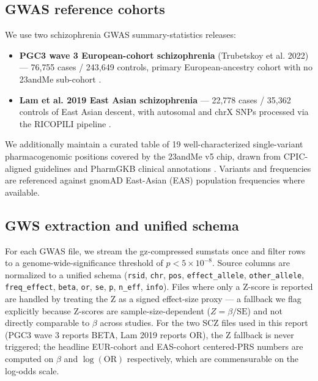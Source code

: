 \documentclass[11pt,a4paper]{article}
\begin{document}
\subsection{GWAS reference cohorts}
We use two schizophrenia GWAS summary-statistics releases:

\begin{itemize}
\item \textbf{PGC3 wave 3 European-cohort schizophrenia} (Trubetskoy et al. 2022) --- 76{,}755 cases / 243{,}649 controls, primary European-ancestry cohort with no 23andMe sub-cohort \cite{trubetskoy2022}.
\item \textbf{Lam et al. 2019 East Asian schizophrenia} --- 22{,}778 cases / 35{,}362 controls of East Asian descent, with autosomal and chrX SNPs processed via the RICOPILI pipeline \cite{lam2019}.
\end{itemize}

We additionally maintain a curated table of 19 well-characterized single-variant pharmacogenomic positions covered by the 23andMe v5 chip, drawn from CPIC-aligned guidelines and PharmGKB clinical annotations \cite{cpic2022clopidogrel,cpic2021ppi,cpic2022slco1b1,cpic2018dpyd,cpic2017warfarin,cpic2021oprm1,cpic2018hlab1502}. Variants and frequencies are referenced against gnomAD East-Asian (EAS) population frequencies where available.

\subsection{GWS extraction and unified schema}
For each GWAS file, we stream the gz-compressed sumstats once and filter rows to a genome-wide-significance threshold of $p < 5 \times 10^{-8}$. Source columns are normalized to a unified schema (\texttt{rsid}, \texttt{chr}, \texttt{pos}, \texttt{effect\_allele}, \texttt{other\_allele}, \texttt{freq\_effect}, \texttt{beta}, \texttt{or}, \texttt{se}, \texttt{p}, \texttt{n\_eff}, \texttt{info}). Files where only a Z-score is reported are handled by treating the Z as a signed effect-size proxy --- a fallback we flag explicitly because Z-scores are sample-size-dependent ($Z = \beta/\text{SE}$) and not directly comparable to $\beta$ across studies. For the two SCZ files used in this report (PGC3 wave 3 reports BETA, Lam 2019 reports OR), the Z fallback is never triggered; the headline EUR-cohort and EAS-cohort centered-PRS numbers are computed on $\beta$ and $\log(\text{OR})$ respectively, which are commensurable on the log-odds scale.
\end{document}
